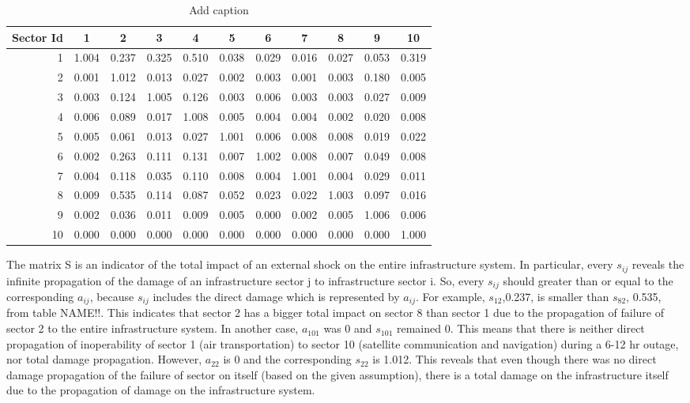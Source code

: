 \documentclass[11pt,a4paper]{article}
\begin{document}
\begin{table}[htbp]
  \centering
  \caption{Add caption}
    \begin{tabular}{r|rrrrrrrrrr}
    \toprule
    Sector Id & \multicolumn{1}{c}{1} & \multicolumn{1}{c}{2} & \multicolumn{1}{c}{3} & \multicolumn{1}{c}{4} & \multicolumn{1}{c}{5} & \multicolumn{1}{c}{6} & \multicolumn{1}{c}{7} & \multicolumn{1}{c}{8} & \multicolumn{1}{c}{9} & \multicolumn{1}{c}{10} \\
    \midrule
    1     & 1.004 & 0.237 & 0.325 & 0.510 & 0.038 & 0.029 & 0.016 & 0.027 & 0.053 & 0.319 \\
    2     & 0.001 & 1.012 & 0.013 & 0.027 & 0.002 & 0.003 & 0.001 & 0.003 & 0.180 & 0.005 \\
    3     & 0.003 & 0.124 & 1.005 & 0.126 & 0.003 & 0.006 & 0.003 & 0.003 & 0.027 & 0.009 \\
    4     & 0.006 & 0.089 & 0.017 & 1.008 & 0.005 & 0.004 & 0.004 & 0.002 & 0.020 & 0.008 \\
    5     & 0.005 & 0.061 & 0.013 & 0.027 & 1.001 & 0.006 & 0.008 & 0.008 & 0.019 & 0.022 \\
    6     & 0.002 & 0.263 & 0.111 & 0.131 & 0.007 & 1.002 & 0.008 & 0.007 & 0.049 & 0.008 \\
    7     & 0.004 & 0.118 & 0.035 & 0.110 & 0.008 & 0.004 & 1.001 & 0.004 & 0.029 & 0.011 \\
    8     & 0.009 & 0.535 & 0.114 & 0.087 & 0.052 & 0.023 & 0.022 & 1.003 & 0.097 & 0.016 \\
    9     & 0.002 & 0.036 & 0.011 & 0.009 & 0.005 & 0.000 & 0.002 & 0.005 & 1.006 & 0.006 \\
    10    & 0.000 & 0.000 & 0.000 & 0.000 & 0.000 & 0.000 & 0.000 & 0.000 & 0.000 & 1.000 \\
    \bottomrule
    \end{tabular}%
  \label{tab:addlabel}%
\end{table}%
The matrix S is an indicator of the total impact of an external shock on the entire infrastructure system. In particular, every $s_{ij}$ reveals the infinite propagation of the damage of an infrastructure sector j to infrastructure sector i. So, every $s_{ij}$ should greater than or equal to the corresponding $a_{ij}$, because $s_{ij}$ includes the direct damage which is represented by $a_{ij}$.
 For example, $s_{12}$,0.237, is smaller than $s_{82}$, 0.535, from table NAME!!. This indicates that sector 2 has a bigger total impact on sector 8 than sector 1 due to the propagation of failure of sector 2 to the entire infrastructure system. In another case, $a_{101}$ was 0 and $s_{101}$ remained 0.
  This means that there is neither direct propagation of inoperability of sector 1 (air transportation) to sector 10 (satellite communication and navigation) during a 6-12 hr outage, nor total damage propagation.
   However, $a_{22}$ is 0 and the corresponding $s_{22}$ is 1.012. This reveals that even though there was no direct damage propagation of the failure of sector on itself (based on the given assumption), there is a total damage on the infrastructure itself due to the propagation of damage on the infrastructure system. 
\end{document}
